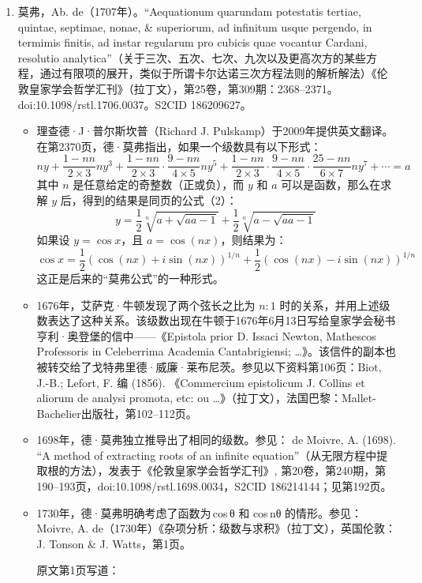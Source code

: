 \begin{enumerate}
\item 莫弗，Ab. de（1707年）。“Aequationum quarundam potestatis tertiae, quintae, septimae, nonae, & superiorum, ad infinitum usque pergendo, in termimis finitis, ad instar regularum pro cubicis quae vocantur Cardani, resolutio analytica”（关于三次、五次、七次、九次以及更高次方的某些方程，通过有限项的展开，类似于所谓卡尔达诺三次方程法则的解析解法）《伦敦皇家学会哲学汇刊》（拉丁文），第25卷，第309期：2368–2371。doi:10.1098/rstl.1706.0037。S2CID 186209627。
\begin{itemize}
\item 理查德·J·普尔斯坎普（Richard J. Pulskamp）于2009年提供英文翻译。
在第2370页，德·莫弗指出，如果一个级数具有以下形式：
$$
ny + \frac{1 - nn}{2 \times 3}ny^3 + \frac{1 - nn}{2 \times 3} \cdot \frac{9 - nn}{4 \times 5}ny^5 + \frac{1 - nn}{2 \times 3} \cdot \frac{9 - nn}{4 \times 5} \cdot \frac{25 - nn}{6 \times 7}ny^7 + \cdots = a~
$$
其中 $n$ 是任意给定的奇整数（正或负），而 $y$ 和 $a$ 可以是函数，那么在求解 $y$ 后，得到的结果是同页的公式（2）：
$$
y = \frac{1}{2} \sqrt[n]{a + \sqrt{aa - 1}} + \frac{1}{2} \sqrt[n]{a - \sqrt{aa - 1}}~
$$
如果设 $y = \cos x$，且 $a = \cos(nx)$，则结果为：
$$
\cos x = \frac{1}{2}(\cos(nx) + i \sin(nx))^{1/n} + \frac{1}{2}(\cos(nx) - i \sin(nx))^{1/n}~
$$
这正是后来的“莫弗公式”的一种形式。
\item 1676年，艾萨克·牛顿发现了两个弦长之比为 $n:1$ 时的关系，并用上述级数表达了这种关系。该级数出现在牛顿于1676年6月13日写给皇家学会秘书亨利·奥登堡的信中——《Epistola prior D. Issaci Newton, Mathescos Professoris in Celeberrima Academia Cantabrigiensi; …》。该信件的副本也被转交给了戈特弗里德·威廉·莱布尼茨。参见以下资料第106页：Biot, J.-B.; Lefort, F. 编 (1856). 《Commercium epistolicum J. Collins et aliorum de analysi promota, etc: ou …》（拉丁文），法国巴黎：Mallet-Bachelier出版社，第102–112页。
\item 1698年，德·莫弗独立推导出了相同的级数。参见：
de Moivre, A. (1698). “A method of extracting roots of an infinite equation”（从无限方程中提取根的方法），发表于《伦敦皇家学会哲学汇刊》, 第20卷，第240期，第190–193页，doi:10.1098/rstl.1698.0034，S2CID 186214144；见第192页。
\item 1730年，德·莫弗明确考虑了函数为 cos θ 和 cos nθ 的情形。参见：Moivre, A. de（1730年）《杂项分析：级数与求积》（拉丁文），英国伦敦：J. Tonson & J. Watts，第1页。

原文第1页写道：


\end{itemize}
\end{enumerate}
